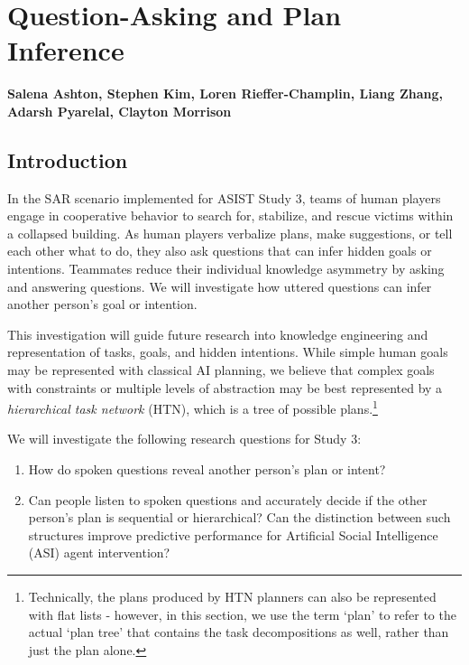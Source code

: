 \chapter{Question-Asking and Plan Inference}
\label{ch:question_plan}
\textbf{Salena Ashton, Stephen Kim, Loren Rieffer-Champlin, Liang Zhang,
Adarsh Pyarelal, Clayton Morrison}

\section{Introduction}

In the SAR scenario implemented for ASIST Study 3, teams of human players
engage in cooperative behavior to search for, stabilize, and rescue victims
within a collapsed building. As human players verbalize plans, make
suggestions, or tell each other what to do, they also ask questions that can
infer hidden goals or intentions. Teammates reduce their individual knowledge
asymmetry by asking and answering questions.  We will investigate how uttered
questions can infer another person's goal or intention. 

This investigation will guide future research into knowledge engineering and
representation of tasks, goals, and hidden intentions. While simple human goals
may be represented with classical AI planning, we believe that complex goals with 
constraints or multiple levels of abstraction may be best
represented by a \emph{hierarchical task network} (HTN), which is a tree of possible
plans.\footnote{Technically, the plans produced by HTN planners can also be
    represented with flat lists - however, in this section, we use the term
`plan' to refer to the actual `plan tree' that contains the task decompositions
as well, rather than just the plan alone.}

We will investigate the following research questions for Study 3:

\begin{enumerate}
    \item How do spoken questions reveal another person's plan or intent? 
    \item Can people listen to spoken questions and accurately decide if the
        other person's plan is sequential or hierarchical? Can the
        distinction between such structures improve predictive performance for
        Artificial Social Intelligence (ASI) agent intervention?
\end{enumerate}


